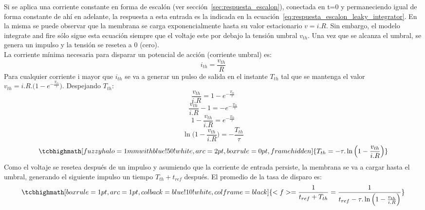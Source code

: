 Si se aplica una corriente constante en forma de escalón (ver sección~\ref{sec:respuesta_escalon}), conectada en t=0 y permaneciendo igual de forma constante de ahí en adelante, la respuesta a esta entrada es la indicada en la ecuación~\ref{eq:respuesta_escalon_leaky_integrator}. En la misma se puede observar que la membrana se carga exponencialmente hasta su valor estacionario $v=i.R$. Sin embargo, el modelo integrate and fire sólo sigue esta ecuación siempre que el voltaje este por debajo la tensión umbral $v_{th}$. Una vez que se alcanza el umbral, se genera un impulso y la tensión se resetea a 0 (cero).\\
La corriente mínima necesaria para disparar un potencial de acción (corriente umbral) es:
\[i_{th}=\frac{v_{th}}{R}\]
Para cualquier corriente i mayor que $i_{th}$ se va a generar un pulso de salida en el instante $T_{th}$ tal que se mantenga el valor $v_{th}=i.R.\big(1-e^{-\frac{T_{th}}{\tau}}\big)$. Despejando $T_{th}$:
\[\frac{v_{th}}{i.R}=1-e^{-\frac{T_{th}}{\tau}}\]
\[\frac{v_{th}}{i.R}-1=-e^{-\frac{T_{th}}{\tau}}\]
\[1-\frac{v_{th}}{i.R}=e^{-\frac{T_{th}}{\tau}}\]
\[\ln{\Big(1-\frac{v_{th}}{i.R}\Big)}=-\frac{T_{th}}{\tau}\]
\begin{equation}
    \tcbhighmath[fuzzy halo=1mm with blue!50!white,arc=2pt,
  boxrule=0pt,frame hidden]{T_{th}=-\tau.\ln{\Big(1-\frac{v_{th}}{i.R}\Big)}}
\end{equation}
Como el voltaje se resetea después de un impulso y asumiendo que la corriente de entrada persiste, la membrana se va a cargar hasta el umbral, generando el siguiente impulso un tiempo $T_{th}+t_{ref}$ después. El promedio de la tasa de disparo es:
\begin{equation}
   \tcbhighmath[boxrule=1pt,arc=1pt,colback=blue!10!white,colframe=black]{ <f>=\frac{1}{t_{ref}+T_{th}}=\frac{1}{t_{ref}-\tau.\ln{\Big(1-\frac{v_{th}}{i.R}\Big)}}}
\end{equation}
